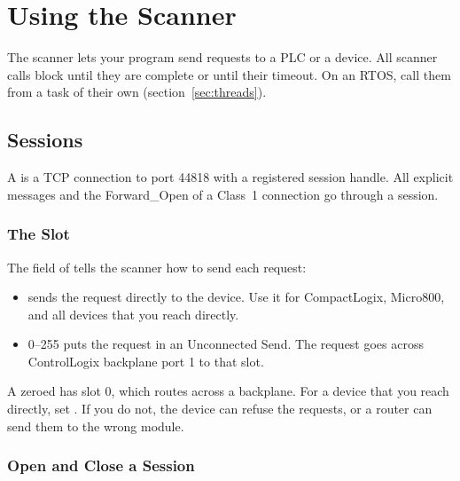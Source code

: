 \chapter{Using the Scanner}\label{ch:scanner}

The scanner lets your program send requests to a PLC or a device. All
scanner calls block until they are complete or until their timeout. On an
RTOS, call them from a task of their own (section~\ref{sec:threads}).

\section{Sessions}\label{sec:sessions}

A  is a TCP connection to port 44818 with a registered session
handle. All explicit messages and the Forward\_Open of a Class~1 connection
go through a session.

\subsection{The Slot}

The  field of  tells the scanner how to send
each request:

\begin{itemize}
  \item {} sends the request directly to the device. Use it for
        CompactLogix, Micro800, and all devices that you reach directly.
  \item {} 0--255 puts the request in an Unconnected Send. The
        request goes across ControlLogix backplane port 1 to that slot.
\end{itemize}

\begin{caution}
A zeroed  has slot 0, which routes across a backplane.
For a device that you reach directly, set . If you do not,
the device can refuse the requests, or a router can send them to the wrong
module.
\end{caution}

\subsection{Open and Close a Session}

